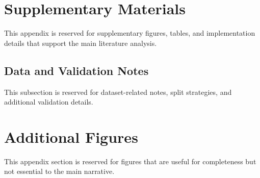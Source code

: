 \appendix
\section{Supplementary Materials}

This appendix is reserved for supplementary figures, tables, and implementation details that support the main literature analysis.

\subsection{Data and Validation Notes}

This subsection is reserved for dataset-related notes, split strategies, and additional validation details.

\section{Additional Figures}

This appendix section is reserved for figures that are useful for completeness but not essential to the main narrative.
